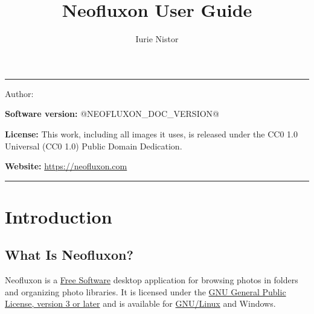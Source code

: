 \documentclass[11pt]{article}
\title{Neofluxon User Guide}
\author{Iurie Nistor}
\date{}
\begin{document}
\hypersetup{pageanchor=false}
\makeatletter
\begin{titlepage}
\thispagestyle{empty}
\color{NFInk}
\vspace*{1.2cm}
\noindent\textcolor{NFAccent}{\rule{3.2cm}{3pt}}

\vspace{1.4cm}
\begin{flushleft}
{\sffamily\bfseries\fontsize{32}{38}\selectfont\color{NFPrimary}\@title\par}
\vspace{0.5cm}
{\sffamily\Large\color{NFMuted}Author: \@author\par}
\end{flushleft}

\vspace{1.3cm}
\noindent\colorbox{NFLight}{%
  \parbox{\dimexpr\textwidth-2\fboxsep\relax}{%
    \vspace{0.35cm}
    \textbf{Software version:} @NEOFLUXON_DOC_VERSION@ \par
    \vspace{0.25cm}
    \textbf{License:} This work, including all images it uses, is released under
    the CC0 1.0 Universal (CC0 1.0) Public Domain Dedication. \par
    \vspace{0.25cm}
    \textbf{Website:} \url{https://neofluxon.com}
    \vspace{0.35cm}
  }}
\vfill
\noindent\textcolor{NFAccent}{\rule{\textwidth}{1pt}}
\end{titlepage}
\makeatother

\hypersetup{pageanchor=true}
\setcounter{tocdepth}{2}
\setcounter{secnumdepth}{0}
\tableofcontents
\clearpage
{}

\section{Introduction}

\subsection{What Is Neofluxon?}

Neofluxon is a \href{https://www.gnu.org/philosophy/free-sw.html}{Free
Software} desktop application for browsing photos in folders and organizing
photo libraries. It is licensed under the
\href{https://www.gnu.org/licenses/gpl-3.0.html}{GNU General Public License,
version 3 or later} and is available for
\href{https://www.gnu.org/gnu/linux-and-gnu.html}{GNU/Linux} and Windows.
\end{document}
